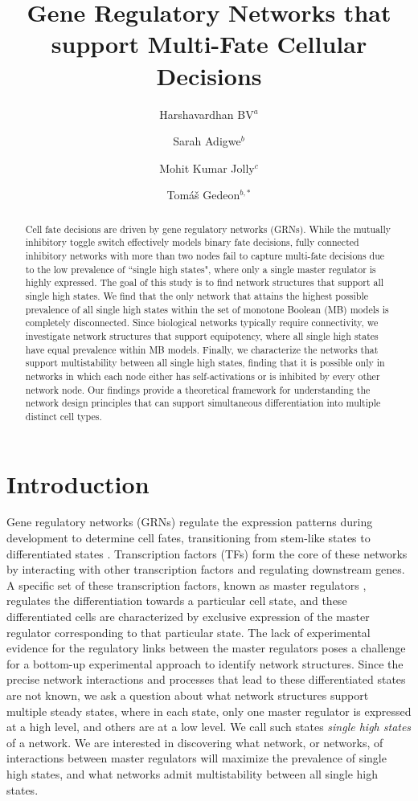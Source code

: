 \documentclass[12pt]{amsart}
\title[Single high state networks]{Gene Regulatory Networks that support Multi-Fate Cellular Decisions}
\author[H. BV]{Harshavardhan BV$^{a}$}
\author[S. Adigwe]{Sarah Adigwe$^{b}$}
\author[MK. Jolly]{Mohit Kumar Jolly$^{c}$}
\author[T. Gedeon]{Tom\'{a}\v{s} Gedeon$^{b,*}$}
\theoremstyle{definition}
\begin{document}
\begin{abstract}
    Cell fate decisions are driven by gene regulatory networks (GRNs). While the mutually inhibitory toggle switch effectively models binary fate decisions, fully connected inhibitory networks with more than two nodes fail to capture multi-fate decisions due to the low prevalence of ``single high states", where only a single master regulator is highly expressed. The goal of this study is to find network structures that support all single high states. We find that the only network that attains the highest possible prevalence of all single high states within the set of monotone Boolean (MB) models is completely disconnected. Since biological networks typically require connectivity, we investigate network structures that support equipotency, where all single high states have equal prevalence within MB models. Finally, we characterize the networks that support multistability between all single high states, finding that it is possible only in networks in which each node either has self-activations or is inhibited by every other network node. Our findings provide a theoretical framework for understanding the network design principles that can support simultaneous differentiation into multiple distinct cell types.
\end{abstract}

\maketitle

\section{Introduction}

Gene regulatory networks (GRNs) regulate the expression patterns during development to determine cell fates, transitioning from stem-like states to differentiated states \cite{zhou_understanding_2011}. Transcription factors (TFs) form the core of these networks by interacting with other transcription factors and regulating downstream genes. A specific set of these transcription factors, known as master regulators \cite{chan_what_2013}, regulates the differentiation towards a particular cell state, and these differentiated cells are characterized by exclusive expression of the master regulator corresponding to that particular state. The lack of experimental evidence for the regulatory links between the master regulators poses a challenge for a bottom-up experimental approach to identify network structures. Since the precise network interactions and processes that lead to these differentiated states are not known, we ask a question about what network structures support multiple steady states, where in each state, only one master regulator is expressed at a high level, and others are at a low level. We call such states \textit{ single high states} of a network. We are interested in discovering what network, or networks, of interactions between master regulators will maximize the prevalence of single high states, and what networks admit multistability between all single high states. 
\end{document}
